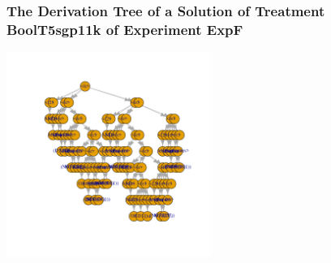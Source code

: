  \begin{frame}
 \frametitle{ The Derivation Tree of a Solution of Treatment BoolT5sgp11k of Experiment ExpF }
 \begin{center}
\includegraphics[width=0.5\textwidth, angle=0]
{ExpFDerivationTreeFigure001.pdf}
 \end{center}
 \label{report/ExpFDerivationTreeFigure001.pdf}  
 \end{frame}

